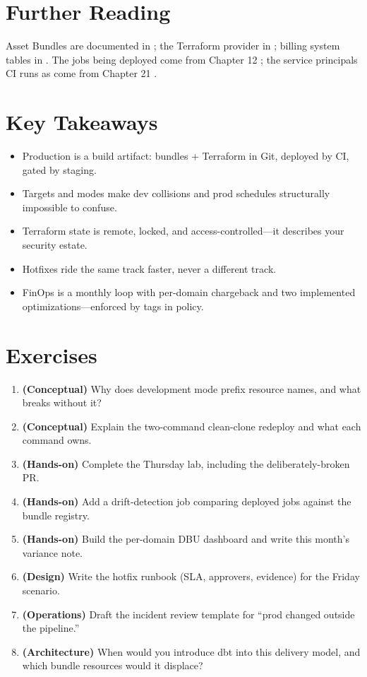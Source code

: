 \section{Further Reading}
Asset Bundles are documented in \cite{databricksAssetBundles}; the Terraform provider in \cite{terraformDatabricks}; billing system tables in \cite{databricksSystemTables}. The jobs being deployed come from Chapter 12 \cite{databricksWorkflows}; the service principals CI runs as come from Chapter 21 \cite{databricksSecurity}.

\section*{Key Takeaways}
\begin{itemize}
    \item Production is a build artifact: bundles + Terraform in Git, deployed by CI, gated by staging.
    \item Targets and modes make dev collisions and prod schedules structurally impossible to confuse.
    \item Terraform state is remote, locked, and access-controlled---it describes your security estate.
    \item Hotfixes ride the same track faster, never a different track.
    \item FinOps is a monthly loop with per-domain chargeback and two implemented optimizations---enforced by tags in policy.
\end{itemize}

\section{Exercises}
\begin{enumerate}
    \item \textbf{(Conceptual)} Why does development mode prefix resource names, and what breaks without it?
    \item \textbf{(Conceptual)} Explain the two-command clean-clone redeploy and what each command owns.
    \item \textbf{(Hands-on)} Complete the Thursday lab, including the deliberately-broken PR.
    \item \textbf{(Hands-on)} Add a drift-detection job comparing deployed jobs against the bundle registry.
    \item \textbf{(Hands-on)} Build the per-domain DBU dashboard and write this month's variance note.
    \item \textbf{(Design)} Write the hotfix runbook (SLA, approvers, evidence) for the Friday scenario.
    \item \textbf{(Operations)} Draft the incident review template for ``prod changed outside the pipeline.''
    \item \textbf{(Architecture)} When would you introduce dbt into this delivery model, and which bundle resources would it displace?
\end{enumerate}
